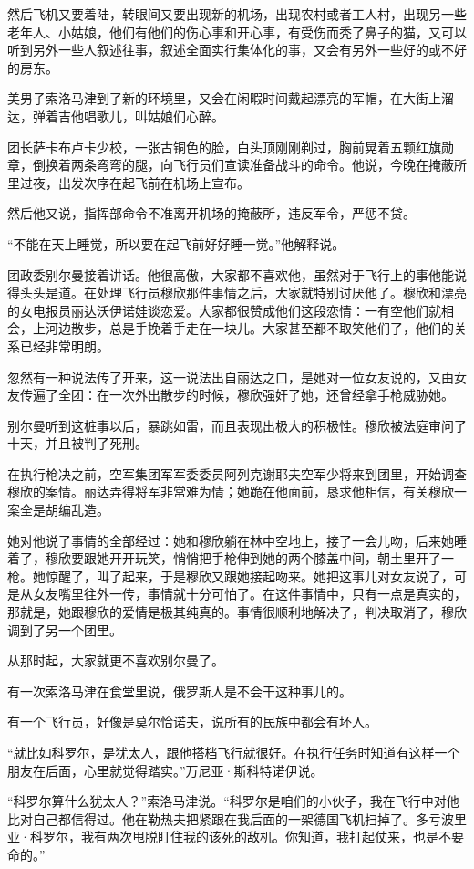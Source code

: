 然后飞机又要着陆，转眼间又要出现新的机场，出现农村或者工人村，出现另一些老年人、小姑娘，他们有他们的伤心事和开心事，有受伤而秃了鼻子的猫，又可以听到另外一些人叙述往事，叙述全面实行集体化的事，又会有另外一些好的或不好的房东。

美男子索洛马津到了新的环境里，又会在闲暇时间戴起漂亮的军帽，在大街上溜达，弹着吉他唱歌儿，叫姑娘们心醉。

团长萨卡布卢卡少校，一张古铜色的脸，白头顶刚刚剃过，胸前晃着五颗红旗勋章，倒换着两条弯弯的腿，向飞行员们宣读准备战斗的命令。他说，今晚在掩蔽所里过夜，出发次序在起飞前在机场上宣布。

然后他又说，指挥部命令不准离开机场的掩蔽所，违反军令，严惩不贷。

“不能在天上睡觉，所以要在起飞前好好睡一觉。”他解释说。

团政委别尔曼接着讲话。他很高傲，大家都不喜欢他，虽然对于飞行上的事他能说得头头是道。在处理飞行员穆欣那件事情之后，大家就特别讨厌他了。穆欣和漂亮的女电报员丽达沃伊诺娃谈恋爱。大家都很赞成他们这段恋情：一有空他们就相会，上河边散步，总是手挽着手走在一块儿。大家甚至都不取笑他们了，他们的关系已经非常明朗。

忽然有一种说法传了开来，这一说法出自丽达之口，是她对一位女友说的，又由女友传遍了全团：在一次外出散步的时候，穆欣强奸了她，还曾经拿手枪威胁她。

别尔曼听到这桩事以后，暴跳如雷，而且表现出极大的积极性。穆欣被法庭审问了十天，并且被判了死刑。

在执行枪决之前，空军集团军军委委员阿列克谢耶夫空军少将来到团里，开始调查穆欣的案情。丽达弄得将军非常难为情；她跪在他面前，恳求他相信，有关穆欣一案全是胡编乱造。

她对他说了事情的全部经过：她和穆欣躺在林中空地上，接了一会儿吻，后来她睡着了，穆欣要跟她开开玩笑，悄悄把手枪伸到她的两个膝盖中间，朝土里开了一枪。她惊醒了，叫了起来，于是穆欣又跟她接起吻来。她把这事儿对女友说了，可是从女友嘴里往外一传，事情就十分可怕了。在这件事情中，只有一点是真实的，那就是，她跟穆欣的爱情是极其纯真的。事情很顺利地解决了，判决取消了，穆欣调到了另一个团里。

从那时起，大家就更不喜欢别尔曼了。

有一次索洛马津在食堂里说，俄罗斯人是不会干这种事儿的。

有一个飞行员，好像是莫尔恰诺夫，说所有的民族中都会有坏人。

“就比如科罗尔，是犹太人，跟他搭档飞行就很好。在执行任务时知道有这样一个朋友在后面，心里就觉得踏实。”万尼亚·斯科特诺伊说。

“科罗尔算什么犹太人？”索洛马津说。“科罗尔是咱们的小伙子，我在飞行中对他比对自己都信得过。他在勒热夫把紧跟在我后面的一架德国飞机扫掉了。多亏波里亚·科罗尔，我有两次甩脱盯住我的该死的敌机。你知道，我打起仗来，也是不要命的。”

